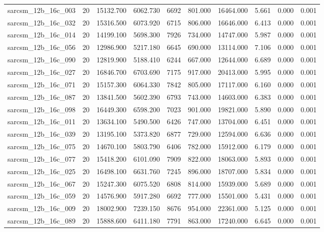 \begin{tabular}{lrrrrrrrrr}
sarcsm\_12b\_16c\_003 & 20 & 15132.700 & 6062.730 & 6692 & 801.000 & 16464.000 & 5.661 & 0.000 & 0.001 \\
sarcsm\_12b\_16c\_032 & 20 & 15316.500 & 6073.920 & 6715 & 806.000 & 16646.000 & 6.413 & 0.000 & 0.001 \\
sarcsm\_12b\_16c\_014 & 20 & 14199.100 & 5698.300 & 7926 & 734.000 & 14747.000 & 5.987 & 0.000 & 0.001 \\
sarcsm\_12b\_16c\_056 & 20 & 12986.900 & 5217.180 & 6645 & 690.000 & 13114.000 & 7.106 & 0.000 & 0.001 \\
sarcsm\_12b\_16c\_090 & 20 & 12819.900 & 5188.410 & 6244 & 667.000 & 12644.000 & 6.689 & 0.000 & 0.001 \\
sarcsm\_12b\_16c\_027 & 20 & 16846.700 & 6703.690 & 7175 & 917.000 & 20413.000 & 5.995 & 0.000 & 0.001 \\
sarcsm\_12b\_16c\_071 & 20 & 15157.300 & 6064.330 & 7842 & 805.000 & 17117.000 & 6.160 & 0.000 & 0.001 \\
sarcsm\_12b\_16c\_087 & 20 & 13841.500 & 5602.390 & 6793 & 743.000 & 14603.000 & 6.383 & 0.000 & 0.001 \\
sarcsm\_12b\_16c\_098 & 20 & 16449.300 & 6598.200 & 7023 & 901.000 & 19821.000 & 5.890 & 0.000 & 0.001 \\
sarcsm\_12b\_16c\_011 & 20 & 13634.100 & 5490.500 & 6426 & 747.000 & 13704.000 & 6.451 & 0.000 & 0.001 \\
sarcsm\_12b\_16c\_039 & 20 & 13195.100 & 5373.820 & 6877 & 729.000 & 12594.000 & 6.636 & 0.000 & 0.001 \\
sarcsm\_12b\_16c\_075 & 20 & 14670.100 & 5803.790 & 6406 & 782.000 & 15912.000 & 6.179 & 0.000 & 0.001 \\
sarcsm\_12b\_16c\_077 & 20 & 15418.200 & 6101.090 & 7909 & 822.000 & 18063.000 & 5.893 & 0.000 & 0.001 \\
sarcsm\_12b\_16c\_025 & 20 & 16498.100 & 6631.760 & 7245 & 896.000 & 18707.000 & 5.834 & 0.000 & 0.001 \\
sarcsm\_12b\_16c\_067 & 20 & 15247.300 & 6075.520 & 6808 & 814.000 & 15939.000 & 5.689 & 0.000 & 0.001 \\
sarcsm\_12b\_16c\_059 & 20 & 14576.900 & 5917.280 & 6692 & 777.000 & 15501.000 & 5.431 & 0.000 & 0.001 \\
sarcsm\_12b\_16c\_009 & 20 & 18002.900 & 7239.150 & 8676 & 954.000 & 22361.000 & 5.125 & 0.000 & 0.001 \\
sarcsm\_12b\_16c\_089 & 20 & 15888.600 & 6411.180 & 7791 & 863.000 & 17240.000 & 6.645 & 0.000 & 0.001 \\

\end{tabular}
